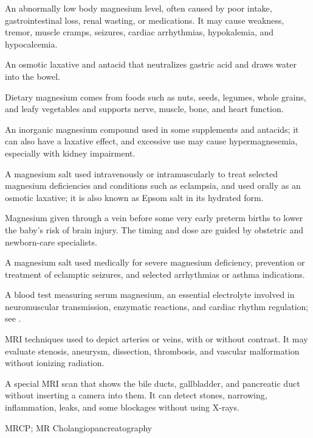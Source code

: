  An abnormally low body magnesium level, often caused by poor intake, gastrointestinal
loss, renal wasting, or medications. It may cause weakness, tremor, muscle cramps,
seizures, cardiac arrhythmias, hypokalemia, and hypocalcemia.

 An osmotic laxative and antacid that neutralizes gastric acid and draws water into the bowel.

 Dietary magnesium comes from foods such as nuts, seeds, legumes, whole grains, and leafy vegetables and supports nerve, muscle, bone, and heart function.

 An inorganic magnesium compound used in some supplements and antacids; it can also have a laxative effect, and excessive use may cause hypermagnesemia, especially with kidney impairment.

 A magnesium salt used intravenously or intramuscularly to treat selected magnesium deficiencies and conditions such as eclampsia, and used orally as an osmotic laxative; it is also known as Epsom salt in its hydrated form.

 Magnesium given through a vein before some very early preterm births to lower the baby's risk of brain injury. The timing and dose are guided by obstetric and newborn-care specialists.

 A magnesium salt used medically for severe magnesium deficiency, prevention or treatment of eclamptic seizures, and selected arrhythmias or asthma indications.

 A blood test measuring serum magnesium, an essential electrolyte involved in neuromuscular transmission, enzymatic reactions, and cardiac rhythm regulation; see .

 MRI techniques used to depict arteries or veins, with or without contrast. It may evaluate stenosis, aneurysm, dissection, thrombosis, and vascular malformation without ionizing radiation.

 A special MRI scan that shows the bile ducts, gallbladder, and pancreatic duct without inserting a camera into them. It can detect stones, narrowing, inflammation, leaks, and some blockages without using X-rays.

\synonyms
MRCP; MR Cholangiopancreatography

